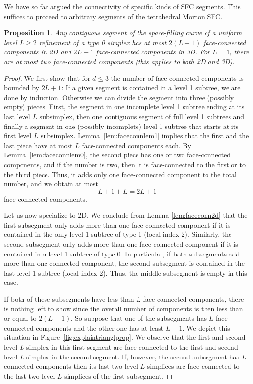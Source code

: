 \documentclass[a4paper,11pt]{article}
\newtheorem{prop}[thm]{Proposition}
\begin{document}
We have so far argued the connectivity of specific kinds of SFC segments.
This suffices to proceed to arbitrary segments of the tetrahedral Morton SFC.
\begin{prop}
\label{prop:faceconncomp}
 Any contiguous segment of the space-filling curve of a uniform level $L\geq2$
 refinement of a type 0 simplex has at most $2(L-1)$ face-connected components in 2D and
 $2L+1$ face-connected components in 3D.
 For $L=1$, there are at most two face-connected components
 (this applies to both 2D and 3D).
\end{prop}
\begin{proof}
 We first show that for $d \le 3$ the number of face-connected
 com\-po\-nents is bounded by $2L+1$:
If a given segment is contained in a level 1 subtree, we are done by induction.
 Otherwise we can divide the segment into three (possibly empty) pieces:
 First,
the segment in one incomplete level 1 subtree ending at its last level $L$
 subsimplex,
 then one contiguous segment of full level 1 subtrees
 and finally a segment in one (possibly incomplete) level 1 subtree that
 starts at its first level $L$ subsimplex.
 Lemma~\ref{lem:faceconnlem1}
 implies that the first and the last piece have at most $L$ face-connected
 components each.
 By Lemma~\ref{lem:faceconnlem0}, the second piece has one or two
 face-connected components, and if the number is two, then it is face-connected
 to the first or to the third piece.
 Thus, it adds only one face-connected component to the total number, and we
 obtain at most
 \begin{equation}
  L + 1 + L = 2L + 1
 \end{equation}
 face-connected components.

Let us now specialize to 2D.
We conclude from Lemma \ref{lem:faceconn2d} that
the first subsegment only adds more than one face-connected component if
it is contained in the only level 1 subtree of type 1 (local index 2).
Similarly, the second subsegment only adds more than one face-connected component
if it is contained in a level 1 subtree of type 0.
In particular, if both subsegments add more than one connected component, the
second subsegment is contained in the last level 1 subtree (local index 2).
Thus, the middle subsegment is empty in this case.

If both of these subsegments have less than $L$ face-connected components, there
is nothing left to show since the overall number of components is then less
than or equal to $2(L-1)$.
So suppose that one of the subsegments has $L$ face-connected components and the other one
has at least $L-1$.
We depict this situation in Figure~\ref{fig:explaintrianglprop}.
We observe that the first and second level $L$ simplex in this first segment
are face-connected to the first and second level $L$ simplex in the second segment.
If, however, the second subsegment has $L$ connected components then its last two 
level $L$ simplices are face-connected to the last two level $L$ simplices of the first 
subsegment.


\end{proof}
\end{document}
